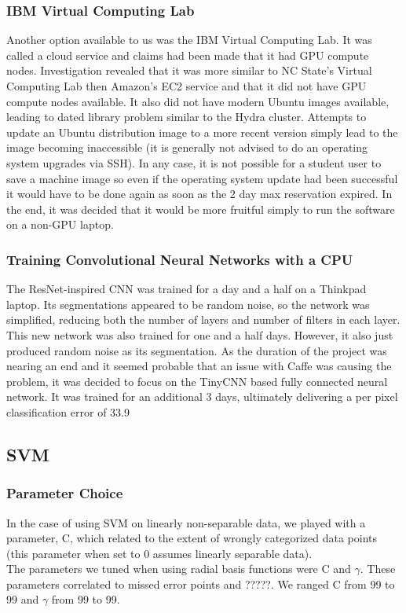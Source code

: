 \documentclass[12pt]{article}
\begin{document}
\subsubsection{IBM Virtual Computing Lab}
	Another option available to us was the IBM Virtual Computing Lab. It was called a cloud service and claims had been made that it had GPU compute nodes.  Investigation revealed that it was more similar to NC State's Virtual Computing Lab then Amazon's EC2 service and that it did not have GPU compute nodes available.  It also did not have modern Ubuntu images available, leading to dated library problem similar to the Hydra cluster.  Attempts to update an Ubuntu distribution image to a more recent version simply lead to the image becoming inaccessible (it is generally not advised to do an operating system upgrades via SSH).  In any case, it is not possible for a student user to save a machine image so even if the operating system update had been successful it would have to be done again as soon as the 2 day max reservation expired.  In the end, it was decided that it would be more fruitful simply to run the software on a non-GPU laptop.

\subsubsection{Training Convolutional Neural Networks with a CPU}

	The ResNet-inspired CNN was trained for a day and a half on a Thinkpad laptop.  Its segmentations appeared to be random noise, so the network was simplified, reducing both the number of layers and  number of filters in each layer.  This new network was also trained for one and a half days.  However, it also just produced random noise as its segmentation.  As the duration of the project was nearing an end and it seemed probable that an issue with Caffe was causing the problem, it was decided to focus on the TinyCNN based fully connected neural network.  It was trained for an additional 3 days, ultimately delivering a per pixel classification error of 33.9%
	\subsection{SVM}
	\subsubsection{Parameter Choice} In the case of using SVM on linearly non-separable data, we played with a parameter, C, which related to the extent of wrongly categorized data points (this parameter when set to 0 assumes linearly separable data).\\
	The parameters we tuned when using radial basis functions were C and $\gamma$. These parameters correlated to missed error points and ?????.  We ranged C from 99 to 99 and $\gamma$ from 99 to 99.
\end{document}
